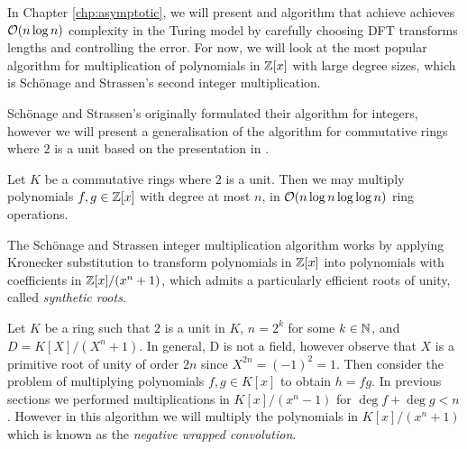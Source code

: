 In Chapter \ref{chp:asymptotic}, we will present and algorithm that achieve achieves $\mathcal O(n\log n)$ complexity in the Turing model by carefully choosing DFT transforms lengths and controlling the error. For now, we will look at the most popular algorithm for multiplication of polynomials in ${\mathbb Z}[x]$ with large degree sizes, which is Sch\"{o}nage and Strassen's second integer multiplication. 

Sch\"{o}nage and Strassen's originally formulated their algorithm for integers, however we will present a generalisation of the algorithm for commutative rings where $2$ is a unit based on the presentation in \cite{modern-comp-alg}.

\medskip


\begin{theorem}
    Let $K$ be a commutative rings where $2$ is a unit. Then we may multiply polynomials $f, g \in {\mathbb Z}[x]$ with degree at most $n$, in $\mathcal O(n \log n \log \log n)$ ring operations.
\end{theorem}

The Sch\"{o}nage and Strassen integer multiplication algorithm works by applying Kronecker substitution to transform polynomials in ${\mathbb Z}[x]$ into polynomials with coefficients in ${\mathbb Z}[x]/(x^n + 1)$, which admits a particularly efficient roots of unity, called \emph{synthetic roots}.


Let $K$ be a ring such that $2$ is a unit in $K$, $n = 2^k$ for some $k \in {\mathbb N}$, and $D = K[X] / (X^n + 1)$. In general, D is not a field, however observe that $X$ is a primitive root of unity of order $2n$ since $X^{2n} = (-1)^2 = 1$. 
Then consider the problem of multiplying polynomials $f, g \in K[x]$ to obtain $h = fg$. In previous sections we performed multiplications in $K[x]/(x^n - 1)$ for $\deg f + \deg g < n$. However in this algorithm we will multiply the polynomials in $K[x]/(x^n + 1)$ which is known as the \textit{negative wrapped convolution}. 

